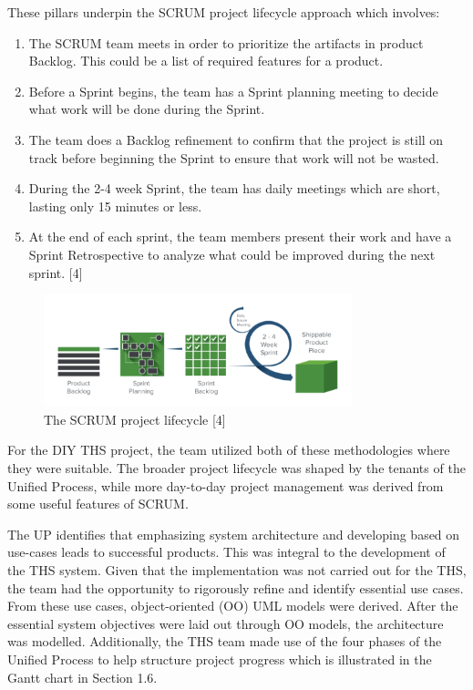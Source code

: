 These pillars underpin the SCRUM project lifecycle approach which
involves:

\begin{enumerate}
  \item The SCRUM team meets in order to prioritize the artifacts in product Backlog. This could be a list of required features for a product.
  \item Before a Sprint begins, the team has a Sprint planning meeting to decide what work will be done during the Sprint.
  \item  The team does a Backlog refinement to confirm that the project is still on track before beginning the Sprint to ensure that work will not be wasted.
  \item  During the 2-4 week Sprint, the team has daily meetings which are short, lasting only 15 minutes or less. 
  \item At the end of each sprint, the team members present their work and have a Sprint Retrospective to analyze what could be improved during the next sprint. [4]
\end{enumerate}

\begin{figure}[H]
      \centering
      \includegraphics[trim = 0 0 0 0, clip, width=0.8\textwidth]{TempImg/SCRUM.png}
      \caption{The SCRUM project lifecycle [4]}
 \end{figure}

For the DIY THS project, the team utilized both of these methodologies
where they were suitable. The broader project lifecycle was shaped by
the tenants of the Unified Process, while more day-to-day project
management was derived from some useful features of SCRUM.

The UP identifies that emphasizing system architecture and developing
based on use-cases leads to successful products. This was integral to
the development of the THS system. Given that the implementation was not
carried out for the THS, the team had the opportunity to rigorously
refine and identify essential use cases. From these use cases,
object-oriented (OO) UML models were derived. After the essential system
objectives were laid out through OO models, the architecture was
modelled. Additionally, the THS team made use of the four phases of the
Unified Process to help structure project progress which is illustrated
in the Gantt chart in Section 1.6.

